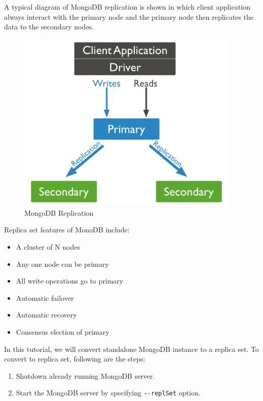\documentclass[12pt]{article}
\begin{document}
\begin{bashcode}
\begin{bashcode}
A typical diagram of MongoDB replication is shown in which client
application always interact with the primary node and the primary node
then replicates the data to the secondary nodes.
\begin{figure}[H]
  \begin{center}
    \includegraphics[width=0.95\textwidth]{replication}
  \end{center}
  \caption{MongoDB Replication}
  \label{fig:mongo-replication}
\end{figure}


Replica set features of MonoDB include:

\begin{itemize}
  \item A cluster of N nodes
  \item Any one node can be primary
  \item All write operations go to primary
  \item Automatic failover
  \item Automatic recovery
  \item Consensus election of primary
\end{itemize}

In this tutorial, we will convert standalone MongoDB instance to a
replica set. To convert to replica set, following are the steps:
\begin{enumerate}
  \item Shutdown already running MongoDB server.
  \item Start the MongoDB server by specifying \verb=--replSet= option.
\end{enumerate}



\end{bashcode}
\end{bashcode}
\end{document}
